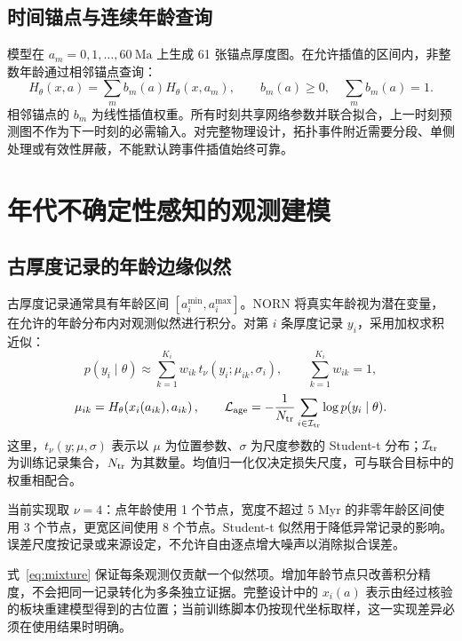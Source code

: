 \documentclass[UTF8,zihao=-4,fontset=none,a4paper]{ctexart}
\newcommand{\loss}{\mathcal{L}}
\begin{document}
\subsection{时间锚点与连续年龄查询}

模型在 $a_m=0,1,\ldots,60\ \mathrm{Ma}$ 上生成 61 张锚点厚度图。在允许插值的区间内，非整数年龄通过相邻锚点查询：
\begin{equation}
  H_\theta(x,a)=\sum_m b_m(a)H_\theta(x,a_m),
  \qquad b_m(a)\geq0,\quad\sum_m b_m(a)=1.
  \label{eq:interpolation}
\end{equation}
相邻锚点的 $b_m$ 为线性插值权重。所有时刻共享网络参数并联合拟合，上一时刻预测图不作为下一时刻的必需输入。对完整物理设计，拓扑事件附近需要分段、单侧处理或有效性屏蔽，不能默认跨事件插值始终可靠。

\section{年代不确定性感知的观测建模}

\subsection{古厚度记录的年龄边缘似然}

古厚度记录通常具有年龄区间 $[a_i^{\min},a_i^{\max}]$。NORN 将真实年龄视为潜在变量，在允许的年龄分布内对观测似然进行积分。对第 $i$ 条厚度记录 $y_i$，采用加权求积近似：
\begin{equation}
  p(y_i\mid\theta)
  \approx\sum_{k=1}^{K_i}w_{ik}\,
  t_\nu\!\left(y_i;\mu_{ik},\sigma_i\right),
  \qquad\sum_{k=1}^{K_i}w_{ik}=1,
  \label{eq:mixture}
\end{equation}
\begin{equation}
  \mu_{ik}=H_\theta\!\left(x_i(a_{ik}),a_{ik}\right),
  \qquad
  \loss_{\rm age}=-\frac{1}{N_{\rm tr}}
  \sum_{i\in\mathcal I_{\rm tr}}\log p(y_i\mid\theta).
  \label{eq:age-loss}
\end{equation}
这里，$t_\nu(y;\mu,\sigma)$ 表示以 $\mu$ 为位置参数、$\sigma$ 为尺度参数的 Student-t 分布；$\mathcal I_{\rm tr}$ 为训练记录集合，$N_{\rm tr}$ 为其数量。均值归一化仅决定损失尺度，可与联合目标中的权重相配合。

当前实现取 $\nu=4$：点年龄使用 1 个节点，宽度不超过 5 Myr 的非零年龄区间使用 3 个节点，更宽区间使用 8 个节点。Student-t 似然用于降低异常记录的影响。误差尺度按记录或来源设定，不允许自由逐点增大噪声以消除拟合误差。

式~\eqref{eq:mixture} 保证每条观测仅贡献一个似然项。增加年龄节点只改善积分精度，不会把同一记录转化为多条独立证据。完整设计中的 $x_i(a)$ 表示由经过核验的板块重建模型得到的古位置；当前训练脚本仍按现代坐标取样，这一实现差异必须在使用结果时明确。
\end{document}
